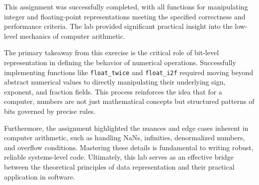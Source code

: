 \documentclass{article}
\begin{document}
This assignment was successfully completed, with all functions for manipulating 
integer and floating-point representations meeting the specified correctness and 
performance criteria. The lab provided significant practical insight into the 
low-level mechanics of computer arithmetic.

The primary takeaway from this exercise is the critical role of bit-level 
representation in defining the behavior of numerical operations. Successfully 
implementing functions like \texttt{float\_twice} and \texttt{float\_i2f} 
required moving beyond abstract numerical values to directly manipulating their 
underlying sign, exponent, and fraction fields. This process reinforces the idea 
that for a computer, numbers are not just mathematical concepts but structured 
patterns of bits governed by precise rules.

Furthermore, the assignment highlighted the nuances and edge cases inherent in 
computer arithmetic, such as handling NaNs, infinities, denormalized numbers, 
and overflow conditions. Mastering these details is fundamental to writing 
robust, reliable systems-level code. Ultimately, this lab serves as an effective 
bridge between the theoretical principles of data representation and their 
practical application in software.
\end{document}
